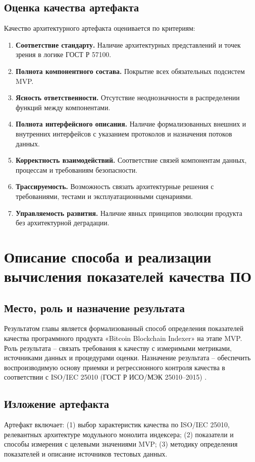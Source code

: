 ﻿\documentclass[14pt,a4paper]{extarticle}
\begin{document}
\subsection{Оценка качества артефакта}
\noindent Качество архитектурного артефакта оценивается по критериям:
\begin{enumerate}
  \item \textbf{Соответствие стандарту.} Наличие архитектурных представлений и точек зрения в логике ГОСТ Р 57100.
  \item \textbf{Полнота компонентного состава.} Покрытие всех обязательных подсистем MVP.
  \item \textbf{Ясность ответственности.} Отсутствие неоднозначности в распределении функций между компонентами.
  \item \textbf{Полнота интерфейсного описания.} Наличие формализованных внешних и внутренних интерфейсов с указанием протоколов и назначения потоков данных.
  \item \textbf{Корректность взаимодействий.} Соответствие связей компонентам данных, процессам и требованиям безопасности.
  \item \textbf{Трассируемость.} Возможность связать архитектурные решения с требованиями, тестами и эксплуатационными сценариями.
  \item \textbf{Управляемость развития.} Наличие явных принципов эволюции продукта без архитектурной деградации.
\end{enumerate}

\newpage

\section{Описание способа и реализации вычисления показателей качества ПО}

\subsection{Место, роль и назначение результата}
\noindent Результатом главы является формализованный способ определения показателей качества программного продукта «Bitcoin Blockchain Indexer» на этапе MVP. Роль результата -- связать требования к качеству с измеримыми метриками, источниками данных и процедурами оценки. Назначение результата -- обеспечить воспроизводимую основу приемки и регрессионного контроля качества в соответствии с ISO/IEC 25010 (ГОСТ Р ИСО/МЭК 25010--2015) \cite{src_gost_25010}.

\subsection{Изложение артефакта}
\noindent Артефакт включает: (1) выбор характеристик качества по ISO/IEC 25010, релевантных архитектуре модульного монолита индексера; (2) показатели и способы измерения с целевыми значениями MVP; (3) методику определения показателей и описание источников тестовых данных.
\end{document}
